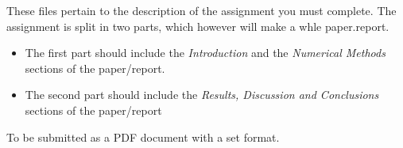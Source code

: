 These files pertain to the description of the assignment you must complete. The assignment is split in two parts, which however will make a whle paper.report.
\begin{itemize}
	\item The first part should include the \textit{Introduction} and the \textit{Numerical Methods} sections of the paper/report.
	\item The second part should include the \textit{Results, Discussion and Conclusions} sections of the paper/report
\end{itemize}
To be submitted as a PDF document with a set format. 